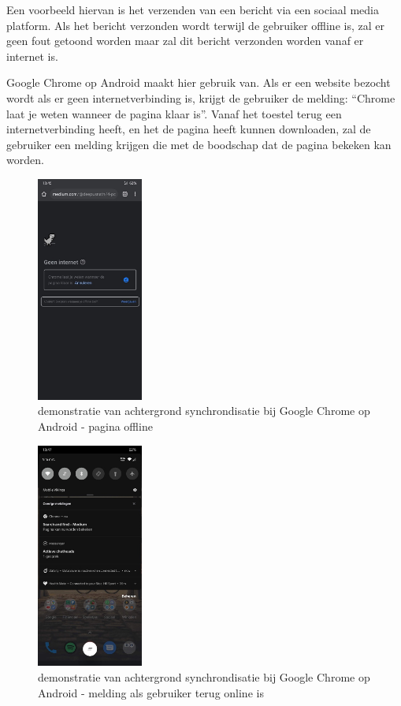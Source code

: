 		Een voorbeeld hiervan is het verzenden van een bericht via een sociaal media platform. Als het bericht verzonden wordt terwijl de gebruiker offline is, zal er geen fout getoond worden maar zal dit bericht verzonden worden vanaf er internet is.
		
		Google Chrome op Android maakt hier gebruik van. Als er een website bezocht wordt als er geen internetverbinding is, krijgt de gebruiker de melding: “Chrome laat je weten wanneer de pagina klaar is”. Vanaf het toestel terug een internetverbinding heeft, en het de pagina heeft kunnen downloaden,  zal de gebruiker een melding krijgen die met de boodschap dat de pagina bekeken kan worden.
	
	
		\begin{figure}[H]
			\centering
			\includegraphics[width=35mm]{./img/backSync1.png}{}
			\caption{demonstratie van achtergrond synchrondisatie bij Google Chrome op Android - pagina offline}
		\end{figure}
		
		\begin{figure}[H]
			\centering
			\includegraphics[width=35mm]{./img/backSync2.png}
			\caption{demonstratie van achtergrond synchrondisatie bij Google Chrome op Android - melding als gebruiker terug online is}
		\end{figure}
		 
